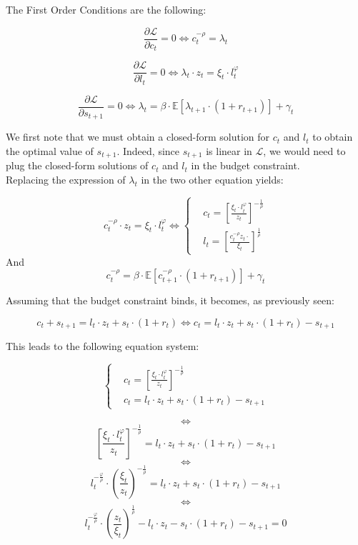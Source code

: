 \documentclass{article}
\begin{document}
The First Order Conditions are the following:

$$\frac{\partial \mathcal{L}}{\partial c_{t}} = 0 \iff c_{t}^{-\rho} = \lambda_{t}$$


$$\frac{\partial \mathcal{L}}{\partial l_{t}} = 0 \iff \lambda_{t}\cdot z_{t} = \xi_{t}\cdot l_{t}^{\varphi}$$


$$\frac{\partial \mathcal{L}}{\partial s_{t+1}} = 0 \iff \lambda_{t} = \beta \cdot \mathbb{E}\left[\lambda_{t+1}\cdot (1+r_{t+1})\right] + \gamma_{t}$$

We first note that we must obtain a closed-form solution for $c_{t}$ and $l_{t}$ to obtain 
the optimal value of $s_{t+1}$. 
Indeed, since $s_{t+1}$ is linear in $\mathcal{L}$, we would need to plug the closed-form
solutions of $c_{t}$ and $l_{t}$ in the budget constraint. \\

Replacing the expression of $\lambda_{t}$ in the two other equation yields: 

\begin{equation}
    c^{-\rho}_{t}\cdot z_{t} = \xi_{t}\cdot l_{t}^{\varphi} \iff
        \begin{cases}
        & c_t = \left[\frac{\xi_{t}\cdot l_{t}^{\varphi}}{z_{t}}\right]^{-\frac{1}{\rho}}\\ 
        & l_{t} = \left[\frac{c_{t}^{-\rho}z_{t}\cdot}{\xi_{t}}\right]^{\frac{1}{\rho}}
    \end{cases}
\end{equation}
And 
\begin{equation}
    c^{-\rho}_{t} = \beta \cdot \mathbb{E}\left[c^{-\rho}_{t+1}\cdot (1+r_{t+1})\right] + \gamma_{t}
\end{equation}

Assuming that the budget constraint binds, it becomes, as previously seen:

$$c_{t} + s_{t+1} = l_{t}\cdot z_{t} + s_{t}\cdot(1+r_{t})
\iff 
c_{t} = l_{t}\cdot z_{t} + s_{t}\cdot(1+r_{t}) - s_{t+1} 
$$

This leads to the following equation system: 

$$
\begin{cases}
    & c_t = \left[\frac{\xi_{t}\cdot l_{t}^{\varphi}}{z_{t}}\right]^{-\frac{1}{\rho}} \\
    & c_{t} = l_{t}\cdot z_{t} + s_{t}\cdot(1+r_{t}) - s_{t+1} 
\end{cases}
$$

$$\iff$$
$$ \left[\frac{\xi_{t}\cdot l_{t}^{\varphi}}{z_{t}}\right]^{-\frac{1}{\rho}} = l_{t}\cdot z_{t} + s_{t}\cdot(1+r_{t}) - s_{t+1} $$
$$\iff$$
$$ l_{t}^{-\frac{\varphi}{\rho}} \cdot \left(\frac{\xi_{t}}{z_{t}}\right)^{-\frac{1}{\rho}} = l_{t}\cdot z_{t} + s_{t}\cdot(1+r_{t}) - s_{t+1} $$
$$\iff$$
$$ l_{t}^{-\frac{\varphi}{\rho}} \cdot \left(\frac{z_{t}}{\xi_{t}}\right)^{\frac{1}{\rho}} - l_{t}\cdot z_{t} - s_{t}\cdot(1+r_{t}) - s_{t+1} = 0 $$
\end{document}
